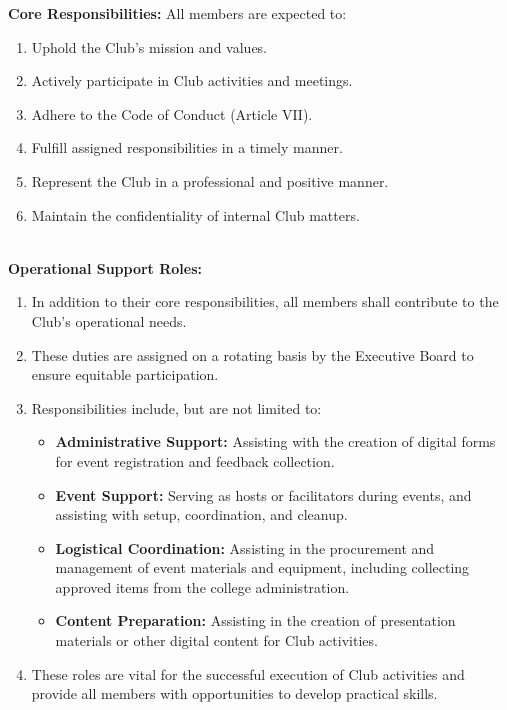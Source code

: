 \textbf{Core Responsibilities:}
All members are expected to:
\begin{enumerate}[label=\alph*), leftmargin=2em, itemsep=0.3em]
    \item Uphold the Club's mission and values.
    \item Actively participate in Club activities and meetings.
    \item Adhere to the Code of Conduct (Article VII).
    \item Fulfill assigned responsibilities in a timely manner.
    \item Represent the Club in a professional and positive manner.
    \item Maintain the confidentiality of internal Club matters.
\end{enumerate}
\\
\textbf{Operational Support Roles:}
\begin{enumerate}[label=\alph*), leftmargin=2em, itemsep=0.3em]
    \item In addition to their core responsibilities, all members shall contribute to the Club's operational needs.
    \item These duties are assigned on a rotating basis by the Executive Board to ensure equitable participation.
    \item Responsibilities include, but are not limited to:
    \begin{itemize}[leftmargin=1.5em, itemsep=0.2em]
        \item \textbf{Administrative Support:} Assisting with the creation of digital forms for event registration and feedback collection.
        \item \textbf{Event Support:} Serving as hosts or facilitators during events, and assisting with setup, coordination, and cleanup.
        \item \textbf{Logistical Coordination:} Assisting in the procurement and management of event materials and equipment, including collecting approved items from the college administration.
        \item \textbf{Content Preparation:} Assisting in the creation of presentation materials or other digital content for Club activities.
    \end{itemize}
    \item These roles are vital for the successful execution of Club activities and provide all members with opportunities to develop practical skills.
\end{enumerate}
\\
